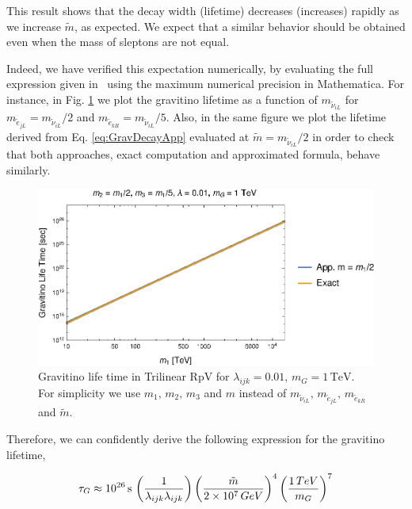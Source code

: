 \documentclass[a4paper,11pt]{article}
\begin{document}
This result shows that the decay width
(lifetime) decreases (increases) rapidly as we increase $\tilde{m}$,
as expected. We expect that a similar behavior should be obtained
even when the mass of sleptons are not equal.

Indeed, we have verified this expectation numerically, by evaluating
the full expression given in~\cite{Moreau:2001sr} using the maximum numerical
precision in Mathematica. For instance, in Fig. \ref{fig:Gravitino-life-time}
we plot the gravitino lifetime as a function of $m_{\tilde{\nu}_{iL}}$
for $m_{\tilde{e}_{jL}}=m_{\tilde{\nu}_{iL}}/2$ and $m_{\tilde{e}_{kR}}=m_{\tilde{\nu}_{iL}}/5$.
Also, in the same figure we plot the lifetime derived from Eq. \ref{eq:GravDecayApp}
evaluated at $\tilde{m}=m_{\tilde{\nu}_{iL}}/2$ in order to check
that both approaches, exact computation and approximated formula,
behave similarly.

\begin{figure}
\begin{centering}
\includegraphics[scale=1.2]{GravitinoDecaym1m2m3Final}
\par\end{centering}

\caption{\label{fig:Gravitino-life-time}Gravitino life time in Trilinear RpV
for $\lambda_{ijk}=0.01,\,m_{G}=1\,\mbox{TeV}$. For simplicity we
use $m_{1},\,m_{2},\,m_{3}$ and $m$ instead of $m_{\tilde{\nu}_{iL}},\,m_{\tilde{e}_{jL}},\,m_{\tilde{e}_{kR}}$
and $\tilde{m}$.}
\end{figure}


Therefore, we can confidently derive the following expression for
the gravitino lifetime,

\begin{equation}
\tau_{G} \approx 10^{26}\,\text{s}\,\left(\frac{1}{\lambda_{ijk}\lambda_{ijk}}\right)\left(\frac{\tilde{m}}{2\times 10^{7}\mbox{\,GeV}}\right)^{4}\left(\frac{1\,\mbox{TeV}}{m_{G}}\right)^{7}\label{eq:GravLifeTime}
\end{equation}
\end{document}
